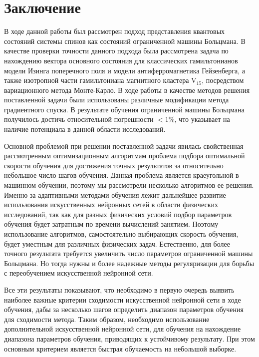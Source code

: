 \chapter*{Заключение}

В ходе данной работы был рассмотрен подход представления квантовых состояний системы спинов как состояний ограниченной машины Больцмана. 
В качестве проверки точности данного подхода была рассмотрена задача по нахождению вектора основного состояния для классических гамильтонианов модели Изинга поперечного поля и модели антиферромагнетика Гейзенберга, а также изотропной части гамильтониана магнитного кластера $\text{V}_{15}$, посредством вариационного метода Монте-Карло.
В ходе работы в качестве методов решения поставленной задачи были использованы различные модификации метода градиентного спуска.
В результате обучения ограниченной машины Больцмана получилось достичь относительной погрешности $<1\%$, что указывает на наличие потенциала в данной области исследований.

Основной проблемой при решении поставленной задачи явилась свойственная рассмотренным оптимизационным алгоритмам проблема подбора оптимальной скорости обучения для достижения точных результатов за относительно небольшое число шагов обучения.
Данная проблема является краеугольной в машинном обучении, поэтому мы рассмотрели несколько алгоритмов ее решения.
Именно за адаптивными методами обучения лежит дальнейшее развитие использования искусственных нейронных сетей в области физических исследований, так как для разных физических условий подбор параметров обучения будет затратным по времени вычислений занятием.
Поэтому использование алгоритмов, самостоятельно выбирающих скорость обучения, будет уместным для различных физических задач.
Естественно, для более точного результата требуется увеличить число параметров ограниченной машины Больцмана.
Но тогда нужны и более надежные методы регуляризации для борьбы с переобучением искусственной нейронной сети.

Все эти результаты показывают, что необходимо в первую очередь выявить наиболее важные критерии сходимости искусственной нейронной сети в ходе обучения, дабы за несколько шагов определить диапазон параметров обучения для сходимости метода.
Таким образом, необходимо использование дополнительной искусственной нейронной сети, для обучения на нахождение диапазона параметров обучения, приводящих к устойчивому результату.
При этом основным критерием является быстрая обучаемость на небольшой выборке.